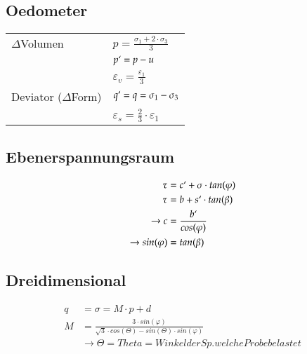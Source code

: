 	
	\begin{minipage}{\linewidth}
\subsection{Oedometer}
	\begin{tabular}{ll}
		$\Delta$Volumen		& $p= \frac{\sigma_1 + 2 \cdot \sigma_3}{3}$ \\
							& $p`= p - u$ \\
							& $\varepsilon_v= \frac{\varepsilon_1}{3}$ \\
		Deviator ($\Delta$Form) &$q`= q = \sigma_1 - \sigma_3$ \\
							& $\varepsilon_s= \frac{2}{3} \cdot \varepsilon_1$ \\
	\end{tabular}
	\end{minipage}



\clearpage
	\begin{minipage}{0.5\linewidth}
\subsection{Ebenerspannungsraum}
	\begin{align*}
		\tau 		&= c`+ \sigma \cdot tan(\varphi) \\
		\tau		&= b + s`\cdot tan(\beta) \\
		\rightarrow c&= \frac{b`}{cos(\varphi)} \\
		\rightarrow sin(\varphi) &= tan(\beta) \\
	\end{align*}
\end{minipage}
\begin{minipage}{0.5\linewidth}
	\vspace*{5cm}
\end{minipage}


\begin{minipage}{0.5\linewidth}
	\subsection{Dreidimensional}
	\begin{align*}
		q			&= \sigma = M \cdot p + d \\
		M			&= \frac{3 \cdot sin(\varphi)}{\sqrt{3} \cdot cos(\Theta) - sin(\Theta) \cdot sin(\varphi)} \\
					& \rightarrow \Theta = Theta =Winkel der Sp. welche Probe belastet\\
	\end{align*}
\end{minipage}
\begin{minipage}{0.3\linewidth}
\vspace{7cm}
\end{minipage}


